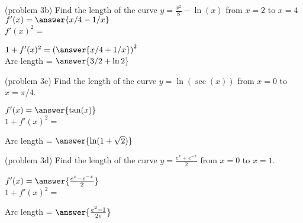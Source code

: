 \documentclass[handout]{ximera}
\begin{document}
\begin{problem}(problem 3b)
Find the length of the curve $\displaystyle{y = \frac{x^2}{8} - \ln(x)}$ from $x = 2$ to $x = 4$\\

$f'(x) = \answer{x/4 - 1/x}$\\

$f'(x)^2 =$

\begin{multipleChoice}
\end{multipleChoice}

$1+f'(x)^2 = \left(\answer{x/4 + 1/x}\right)^2$\\

Arc length = $\answer{3/2 + \ln 2}$
\end{problem}


\begin{problem}(problem 3c)
Find the length of the curve $y = \ln(\sec(x))$ from $x = 0$ to $x = \pi/4$.

$f'(x) = \answer{\tan(x)}$\\

$1 + f'(x)^2 =$

\begin{multipleChoice}
\end{multipleChoice}


Arc length = $\answer{\ln(1 + \sqrt 2)}$
\end{problem}



\begin{problem}(problem 3d)
Find the length of the curve $y = \frac{e^x + e^{-x}}{2}$ from $x = 0$ to $x = 1$.

$f'(x) = \answer{\frac{e^x - e^{-x}}{2}}$\\

$1 + f'(x)^2 =$

\begin{multipleChoice}
\end{multipleChoice}


Arc length = $\answer{\frac{e^2 - 1}{2e}}$
\end{problem}
\end{document}
